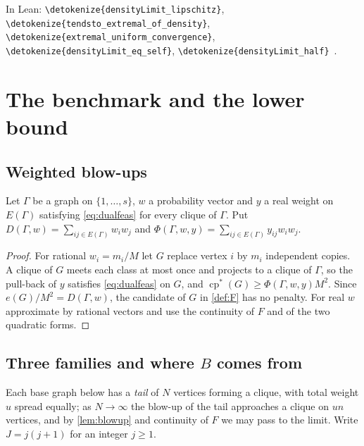 \documentclass[10pt]{article}
\newtheorem{lemma}[theorem]{Lemma}
\theoremstyle{definition}
\theoremstyle{remark}
\numberwithin{equation}{section}
\newcommand{\cps}{\operatorname{cp}^{*}}
\newcommand{\leanid}[1]{\expandafter\nolinkurl\expandafter{\detokenize{#1}}}
\newcommand{\Fm}[1]{\cite[#1]{Formalization}}
\begin{document}
In Lean: \leanid{densityLimit_lipschitz}, \leanid{tendsto_extremal_of_density}, \leanid{extremal_uniform_convergence}, \leanid{densityLimit_eq_self}, \leanid{densityLimit_half}~\Fm{\S3--4}.

\section{The benchmark and the lower bound}\label{sec:benchmark}

\subsection{Weighted blow-ups}
Let $\Gamma$ be a graph on $\{1,\dots,s\}$, $w$ a probability vector and $y$ a real weight on $E(\Gamma)$ satisfying \eqref{eq:dualfeas} for every clique of $\Gamma$. Put $D(\Gamma,w)=\sum_{ij\in E(\Gamma)}w_iw_j$ and $\Phi(\Gamma,w,y)=\sum_{ij\in E(\Gamma)}y_{ij}w_iw_j$.


\begin{proof}
For rational $w_i=m_i/M$ let $G$ replace vertex $i$ by $m_i$ independent copies. A clique of $G$ meets each class at most once and projects to a clique of $\Gamma$, so the pull-back of $y$ satisfies \eqref{eq:dualfeas} on $G$, and $\cps(G)\ge\Phi(\Gamma,w,y)M^2$. Since $e(G)/M^2=D(\Gamma,w)$, the candidate of $G$ in \cref{def:F} has no penalty. For real $w$ approximate by rational vectors and use the continuity of $F$ and of the two quadratic forms.
\end{proof}

\subsection{Three families and where $B$ comes from}\label{sec:families}
Each base graph below has a \emph{tail} of $N$ vertices forming a clique, with total weight $u$ spread equally; as $N\to\infty$ the blow-up of the tail approaches a clique on $un$ vertices, and by \cref{lem:blowup} and continuity of $F$ we may pass to the limit. Write $J=j(j+1)$ for an integer $j\ge1$.
\end{document}
